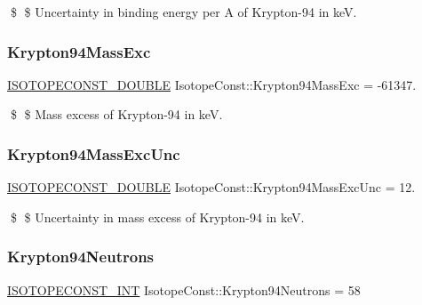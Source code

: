 \$ \$ Uncertainty in binding energy per A of Krypton-\/94 in keV. \mbox{\label{group___isotope_const-_krypton-_kr94_gac9dda00cda67615c0364937d2f1cd45b}} 
\subsubsection{\texorpdfstring{Krypton94\+Mass\+Exc}{Krypton94MassExc}}
{\footnotesize\ttfamily \mbox{\hyperlink{group___isotope_const-_macros_ga8f45a7272ce02c0b4c65c44636ed719a}{I\+S\+O\+T\+O\+P\+E\+C\+O\+N\+S\+T\+\_\+\+D\+O\+U\+B\+LE}} Isotope\+Const\+::\+Krypton94\+Mass\+Exc = -\/61347.}

\$ \$ Mass excess of Krypton-\/94 in keV. \mbox{\label{group___isotope_const-_krypton-_kr94_gac9529ec7b09b1bfcac288ea26712cf9c}} 
\subsubsection{\texorpdfstring{Krypton94\+Mass\+Exc\+Unc}{Krypton94MassExcUnc}}
{\footnotesize\ttfamily \mbox{\hyperlink{group___isotope_const-_macros_ga8f45a7272ce02c0b4c65c44636ed719a}{I\+S\+O\+T\+O\+P\+E\+C\+O\+N\+S\+T\+\_\+\+D\+O\+U\+B\+LE}} Isotope\+Const\+::\+Krypton94\+Mass\+Exc\+Unc = 12.}

\$ \$ Uncertainty in mass excess of Krypton-\/94 in keV. \mbox{\label{group___isotope_const-_krypton-_kr94_ga959180530ee9fbb61c4c66186e0fd08a}} 
\subsubsection{\texorpdfstring{Krypton94\+Neutrons}{Krypton94Neutrons}}
{\footnotesize\ttfamily \mbox{\hyperlink{group___isotope_const-_macros_ga5f18360b3e99483a35c32d789e62621c}{I\+S\+O\+T\+O\+P\+E\+C\+O\+N\+S\+T\+\_\+\+I\+NT}} Isotope\+Const\+::\+Krypton94\+Neutrons = 58}

